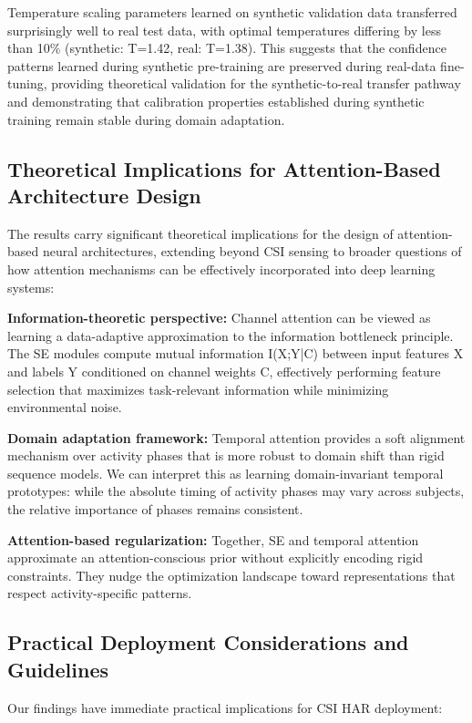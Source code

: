 \documentclass[lettersize,journal]{IEEEtran}
\begin{document}
Temperature scaling parameters learned on synthetic validation data transferred surprisingly well to real test data, with optimal temperatures differing by less than 10\% (synthetic: T=1.42, real: T=1.38). This suggests that the confidence patterns learned during synthetic pre-training are preserved during real-data fine-tuning, providing theoretical validation for the synthetic-to-real transfer pathway and demonstrating that calibration properties established during synthetic training remain stable during domain adaptation.

\subsection{Theoretical Implications for Attention-Based Architecture Design}

The results carry significant theoretical implications for the design of attention-based neural architectures, extending beyond CSI sensing to broader questions of how attention mechanisms can be effectively incorporated into deep learning systems:

\textbf{Information-theoretic perspective:} Channel attention can be viewed as learning a data-adaptive approximation to the information bottleneck principle. The SE modules compute mutual information I(X;Y|C) between input features X and labels Y conditioned on channel weights C, effectively performing feature selection that maximizes task-relevant information while minimizing environmental noise.

\textbf{Domain adaptation framework:} Temporal attention provides a soft alignment mechanism over activity phases that is more robust to domain shift than rigid sequence models. We can interpret this as learning domain-invariant temporal prototypes: while the absolute timing of activity phases may vary across subjects, the relative importance of phases remains consistent.

\textbf{Attention-based regularization:} Together, SE and temporal attention approximate an attention-conscious prior without explicitly encoding rigid constraints. They nudge the optimization landscape toward representations that respect activity-specific patterns.

\subsection{Practical Deployment Considerations and Guidelines}

Our findings have immediate practical implications for CSI HAR deployment:
\end{document}
